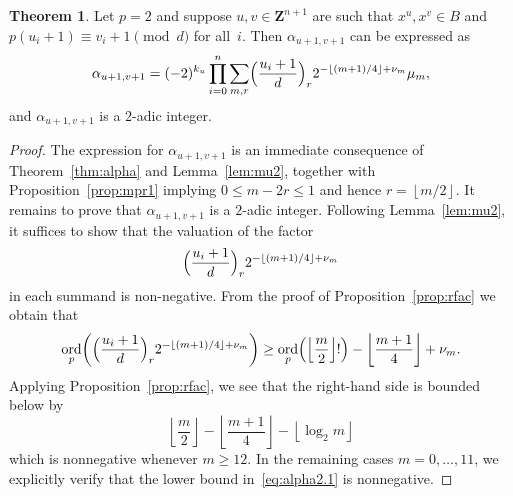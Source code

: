 \documentclass[a4paper,11pt]{article}
\numberwithin{equation}{section}
\providecommand{\floor}[1]{\left\lfloor#1\right\rfloor}   %
\newcommand{\ZZ}{\mathbf{Z}} %
\DeclareMathOperator{\ord}{ord}          %
\theoremstyle{definition}
\newtheorem{thm}{Theorem}[section]
\begin{document}
\begin{thm} \label{thm:alpha2}
Let $p = 2$ and suppose $u, v \in \ZZ^{n+1}$ are such that 
$x^u, x^v \in B$ and  
$p (u_i + 1) \equiv v_i + 1 \pmod{d}$ for all~$i$.  Then $\alpha_{u+1,v+1}$ 
can be expressed as 
\begin{equation} \label{eq:alpha2.0}
\alpha_{u+1,v+1} = (-2)^{k_u} \prod_{i=0}^n \sum_{m,r} 
    \Bigl(\frac{u_i+1}{d}\Bigr)_r 2^{-\floor{(m+1)/4}+\nu_m} \mu_m, 
\end{equation}
and $\alpha_{u+1,v+1}$ is a $2$-adic integer.
\end{thm}

\begin{proof}
The expression for $\alpha_{u+1,v+1}$ is an immediate consequence 
of Theorem~\ref{thm:alpha} and Lemma~\ref{lem:mu2}, together with 
Proposition~\ref{prop:mpr1} implying $0 \leq m - 2r \leq 1$ and 
hence $r = \floor{m/2}$.  It remains to prove that 
$\alpha_{u+1,v+1}$ is a $2$-adic integer.  Following Lemma~\ref{lem:mu2}, 
it suffices to show that the valuation of the factor 
\begin{equation*}
\Bigl(\frac{u_i+1}{d}\Bigr)_r 2^{- \floor{(m+1)/4} + \nu_m}
\end{equation*}
in each summand is non-negative.  From the proof of 
Proposition~\ref{prop:rfac} we obtain that 
\begin{equation} \label{eq:alpha2.1}
\ord_p \biggl( \Bigl(\frac{u_i+1}{d}\Bigr)_r 2^{- \floor{(m+1)/4} + \nu_m} \biggr)
\geq \ord_p\Bigl(\floor{\frac{m}{2}}!\Bigr) - \floor{\frac{m+1}{4}} + \nu_m.
\end{equation}
Applying Proposition~\ref{prop:rfac}, we see that the right-hand side 
is bounded below by 
\begin{equation}
\floor{\frac{m}{2}} - \floor{\frac{m+1}{4}} - \floor{\log_2 m}
\end{equation}
which is nonnegative whenever $m \geq 12$.  In the remaining 
cases $m = 0, \dotsc, 11$, we explicitly verify that the 
lower bound in~\eqref{eq:alpha2.1} is nonnegative.
\end{proof}
\end{document}
